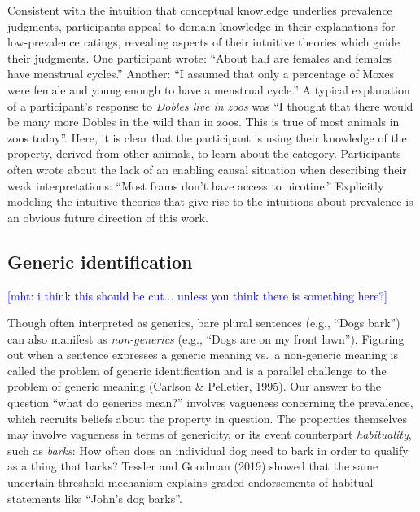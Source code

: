 \documentclass[floatsintext,doc]{apa6}
\begin{document}
Consistent with the intuition that conceptual knowledge underlies prevalence judgments, participants appeal to domain knowledge in their explanations for low-prevalence ratings, revealing aspects of their intuitive theories which guide their judgments.
One participant wrote: \enquote{About half are females and females have menstrual cycles.}
Another: \enquote{I assumed that only a percentage of Moxes were female and young enough to have a menstrual cycle.}
A typical explanation of a participant's response to \emph{Dobles live in zoos} was \enquote{I thought that there would be many more Dobles in the wild than in zoos. This is true of most animals in zoos today}.
Here, it is clear that the participant is using their knowledge of the property, derived from other animals, to learn about the category.
Participants often wrote about the lack of an enabling causal situation when describing their weak interpretations: \enquote{Most frams don't have access to nicotine.}
Explicitly modeling the intuitive theories that give rise to the intuitions about prevalence is an obvious future direction of this work.

\hypertarget{generic-identification}{%
\subsection{Generic identification}\label{generic-identification}}

{\textcolor{Blue}{[mht: i think this should be cut... unless you think there is something here?]}}

Though often interpreted as generics, bare plural sentences (e.g., \enquote{Dogs bark}) can also manifest as \emph{non-generics} (e.g., \enquote{Dogs are on my front lawn}).
Figuring out when a sentence expresses a generic meaning vs.~a non-generic meaning is called the problem of generic identification and is a parallel challenge to the problem of generic meaning (Carlson \& Pelletier, 1995).
Our answer to the question \enquote{what do generics mean?} involves vagueness concerning the prevalence, which recruits beliefs about the property in question.
The properties themselves may involve vagueness in terms of genericity, or its event counterpart \emph{habituality}, such as \emph{barks}: How often does an individual dog need to bark in order to qualify as a thing that barks?
Tessler and Goodman (2019) showed that the same uncertain threshold mechanism explains graded endorsements of habitual statements like \enquote{John's dog barks}.
\end{document}

